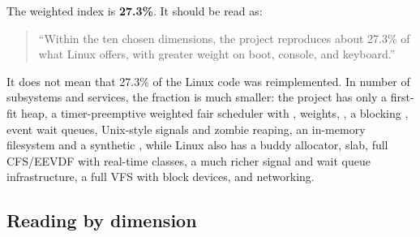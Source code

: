 The weighted index is \textbf{27.3\%}. It should be read as:

\begin{quote}
``Within the ten chosen dimensions, the project reproduces about 27.3\% of
what Linux offers, with greater weight on boot, console, and keyboard.''
\end{quote}

It does not mean that 27.3\% of the Linux code was reimplemented. In
number of subsystems and services, the fraction is much smaller: the
project has only a first-fit heap, a timer-preemptive weighted fair scheduler
with , weights, , a blocking , event
wait queues, Unix-style signals and zombie reaping, an in-memory filesystem
and a synthetic , while Linux also has a buddy allocator, slab,
full CFS/EEVDF with real-time classes, a much richer signal and wait queue
infrastructure, a full VFS with block devices, and networking.

\subsection{Reading by dimension}


